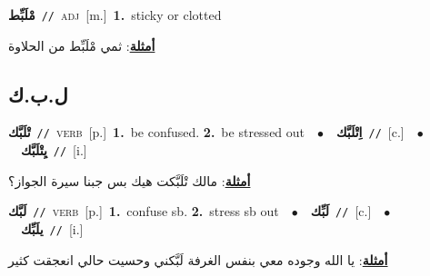 \documentclass[10pt,a4paper,twoside]{article} %
\begin{document}
\begin{multicols}{2}
{\setlength\topsep{0pt}\textbf{\foreignlanguage{arabic}{مْلَبِّط}}\ {\color{gray}\texttt{//}\color{black}}\ \textsc{adj}\ [m.]\ \textbf{1.}~sticky or clotted\  \begin{flushright}\color{gray}\foreignlanguage{arabic}{\textbf{\underline{\foreignlanguage{arabic}{أمثلة}}}: ثمي مْلَبِّط من الحلاوة}\end{flushright}\color{black}} \vspace{2mm}

\vspace{-3mm}
\subsection*{\color{blue}\foreignlanguage{arabic}{ل.ب.ك}\color{blue}{}} 

{\setlength\topsep{0pt}\textbf{\foreignlanguage{arabic}{تْلَبَّك}}\ {\color{gray}\texttt{//}\color{black}}\ \textsc{verb}\ [p.]\ \textbf{1.}~be confused.  \textbf{2.}~be stressed out\ \ $\bullet$\ \ \setlength\topsep{0pt}\textbf{\foreignlanguage{arabic}{اِتْلَبَّك}}\ {\color{gray}\texttt{//}\color{black}}\ [c.]\ \ $\bullet$\ \ \setlength\topsep{0pt}\textbf{\foreignlanguage{arabic}{يِتْلَبَّك}}\ {\color{gray}\texttt{//}\color{black}}\ [i.]\  \begin{flushright}\color{gray}\foreignlanguage{arabic}{\textbf{\underline{\foreignlanguage{arabic}{أمثلة}}}: مالك تْلَبَّكت هيك بس جبنا سيرة الجواز؟}\end{flushright}\color{black}} \vspace{2mm}

{\setlength\topsep{0pt}\textbf{\foreignlanguage{arabic}{لَبَّك}}\ {\color{gray}\texttt{//}\color{black}}\ \textsc{verb}\ [p.]\ \textbf{1.}~confuse sb.  \textbf{2.}~stress sb out\ \ $\bullet$\ \ \setlength\topsep{0pt}\textbf{\foreignlanguage{arabic}{لَبِّك}}\ {\color{gray}\texttt{//}\color{black}}\ [c.]\ \ $\bullet$\ \ \setlength\topsep{0pt}\textbf{\foreignlanguage{arabic}{يلَبِّك}}\ {\color{gray}\texttt{//}\color{black}}\ [i.]\  \begin{flushright}\color{gray}\foreignlanguage{arabic}{\textbf{\underline{\foreignlanguage{arabic}{أمثلة}}}: يا الله وجوده معي بنفس الغرفة لَبَّكني وحسيت حالي انعجقت كثير}\end{flushright}\color{black}} \vspace{2mm}


\end{multicols}
\end{document}
